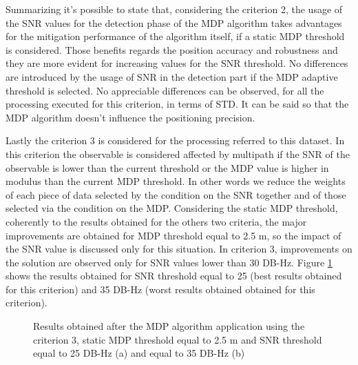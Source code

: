 Summarizing it's possible to state that, considering the criterion 2, the usage of the SNR values for the detection phase of the MDP algorithm takes advantages for the mitigation performance of the algorithm itself, if a static MDP threshold is considered. Those benefits regards the position accuracy and robustness and they are more evident for increasing values for the SNR threshold. No differences are introduced by the usage of SNR in the detection part if the MDP adaptive threshold is selected. No appreciable differences can be observed, for all the processing executed for this criterion, in terms of STD. It can be said so that the MDP algorithm doesn't influence the positioning precision.

Lastly the criterion 3 is considered for the processing referred to this dataset. In this criterion the observable is considered affected by multipath if the SNR of the observable is lower than the current threshold or the MDP value is higher in modulus than the current MDP threshold. In other words we reduce the weights of each piece of data selected by the condition on the SNR together and of those selected via the  condition on the MDP. Considering the static MDP threshold, coherently to the results obtained for the others two criteria, the major improvements are obtained for MDP threshold equal to 2.5 m, so the impact of the SNR value is discussed only for this situation. In criterion 3, improvements on the solution are observed only for SNR values lower than 30 DB-Hz. Figure \ref{FIG:test4mdp_crit3mdpstatic} shows the results obtained for SNR threshold equal to 25 (best results obtained for this criterion) and 35 DB-Hz (worst results obtained obtained for this criterion).

\begin{figure}[H] 
	\centering
    \caption{Results obtained after the MDP algorithm application using the criterion 3, static MDP threshold equal to 2.5 m and SNR threshold equal to 25 DB-Hz (a) and equal to 35 DB-Hz (b)}
	\label{FIG:test4mdp_crit3mdpstatic} 
\end{figure}

